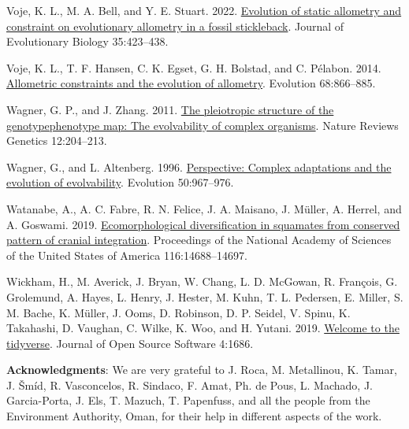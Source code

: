 \documentclass[
  11pt,
]{article}
\newlength{\cslhangindent}
\newlength{\cslentryspacingunit} %
\newenvironment{CSLReferences}[2] %
 {%
  \setlength{\parindent}{0pt}
  \ifodd #1
  \let\oldpar\par
  \def\par{\hangindent=\cslhangindent\oldpar}
  \fi
  \setlength{\parskip}{#2\cslentryspacingunit}
 }%
 {}
\begin{document}
\begin{CSLReferences}{1}{0}
\leavevmode{}%
Voje, K. L., M. A. Bell, and Y. E. Stuart. 2022.
\href{https://doi.org/10.1111/jeb.13984}{Evolution of static allometry
and constraint on evolutionary allometry in a fossil stickleback}.
Journal of Evolutionary Biology 35:423--438.

\leavevmode{}%
Voje, K. L., T. F. Hansen, C. K. Egset, G. H. Bolstad, and C. Pélabon.
2014. \href{https://doi.org/10.1111/evo.12312}{Allometric constraints
and the evolution of allometry}. Evolution 68:866--885.

\leavevmode{}%
Wagner, G. P., and J. Zhang. 2011.
\href{https://doi.org/10.1038/nrg2949}{The pleiotropic structure of the
genotype{\textendash}phenotype map: The evolvability of complex
organisms}. Nature Reviews Genetics 12:204--213.

\leavevmode{}%
Wagner, G., and L. Altenberg. 1996.
\href{https://doi.org/10.1111/j.1558-5646.1996.tb02339.x}{Perspective:
Complex adaptations and the evolution of evolvability}. Evolution
50:967--976.

\leavevmode{}%
Watanabe, A., A. C. Fabre, R. N. Felice, J. A. Maisano, J. Müller, A.
Herrel, and A. Goswami. 2019.
\href{https://doi.org/10.1073/pnas.1820967116}{{Ecomorphological
diversification in squamates from conserved pattern of cranial
integration}}. Proceedings of the National Academy of Sciences of the
United States of America 116:14688--14697.

\leavevmode{}%
Wickham, H., M. Averick, J. Bryan, W. Chang, L. D. McGowan, R. François,
G. Grolemund, A. Hayes, L. Henry, J. Hester, M. Kuhn, T. L. Pedersen, E.
Miller, S. M. Bache, K. Müller, J. Ooms, D. Robinson, D. P. Seidel, V.
Spinu, K. Takahashi, D. Vaughan, C. Wilke, K. Woo, and H. Yutani. 2019.
\href{https://doi.org/10.21105/joss.01686}{Welcome to the {tidyverse}}.
Journal of Open Source Software 4:1686.

\end{CSLReferences}

\newpage

\hfill\break

\textbf{Acknowledgments}: We are very grateful to J. Roca, M.
Metallinou, K. Tamar, J. Šmíd, R. Vasconcelos, R. Sindaco, F. Amat, Ph.
de Pous, L. Machado, J. Garcia-Porta, J. Els, T. Mazuch, T. Papenfuss,
and all the people from the Environment Authority, Oman, for their help
in different aspects of the work.
\end{document}
